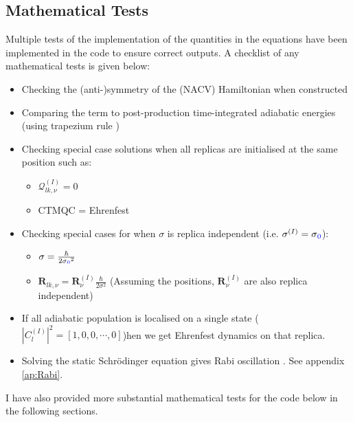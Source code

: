 \subsection{Mathematical Tests}
Multiple tests of the implementation of the quantities in the equations have been implemented in the code to ensure correct outputs. A checklist of any mathematical tests is given below:
\begin{itemize}
  \item Checking the (anti-)symmetry of the (NACV) Hamiltonian when constructed
  
  \item Comparing the   term to post-production time-integrated adiabatic energies (using trapezium rule \cite{NumericalAnalysis})
  
  \item Checking special case solutions when all replicas are initialised at the same position such as:
	\begin{itemize}
	  \item $\mathcal{Q}_{lk, \nu}^{(I)} = 0$
	  \item CTMQC = Ehrenfest
	\end{itemize}

\item Checking special cases for when $\sigma$ is replica independent (i.e. $\sigma^{(I)} = \sigma\textcolor{blue}{_{0}}$):
	\begin{itemize}
		\item $\sigma = \frac{\hbar}{2 \sigma\textcolor{blue}{_{0}}^2}$
	  \item $\mathbf{R}_{lk, \nu} = \mathbf{R}_{\nu}^{(I)} \frac{\hbar}{2 \sigma^2}$ (Assuming the positions, $\mathbf{R}_{\nu}^{(I)}$ are also replica independent)
	\end{itemize}

\item If all adiabatic population is localised on a single state ($|C_{l}^{(I)}|^2 = [1, 0, 0, \cdots, 0]$)hen we get Ehrenfest dynamics on that replica.
  \item Solving the static Schr\"odinger equation gives Rabi oscillation \cite{FeynmanLectVol3}. See appendix \ref{ap:Rabi}.
\end{itemize}

I have also provided  \remove{(} more substantial\remove{)} mathematical tests for the code below in the following sections.
